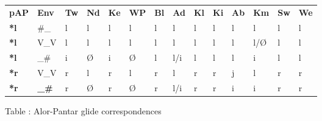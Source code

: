 \begin{center}
\tablehead{}
\begin{supertabular}{m{0.38585985in}m{0.39485985in}m{0.30315986in}m{0.28445986in}m{0.27545986in}m{0.34005985in}m{0.22885984in}m{0.28445986in}m{0.24695987in}m{0.24765986in}m{0.28445986in}m{0.34005985in}m{0.28445986in}m{0.31505984in}}
\textbf{pAP} &
\textbf{Env} &
\textbf{Tw} &
\textbf{Nd} &
\textbf{Ke} &
\textbf{WP} &
\textbf{Bl} &
\textbf{Ad} &
\textbf{Kl} &
\textbf{Ki} &
\textbf{Ab} &
\textbf{Km} &
\textbf{Sw} &
\textbf{We}\\
\textbf{*l} &
\#\_ &
l &
l &
l &
l &
l &
l &
l &
l &
l &
l &
l &
l\\
\textbf{*l} &
V\_V &
l &
l &
l &
l &
l &
l &
l &
l &
l &
l/{\O} &
l &
l\\
\textbf{*l} &
\_\# &
i &
{\O} &
i &
{\O} &
l &
l/i &
l &
l &
l &
i &
l &
l\\
\textbf{*r } &
V\_V &
r &
l &
r &
l &
r &
l &
r &
r &
j &
l &
r &
r\\
\textbf{*r} &
\textbf{\_\#} &
r &
{\O} &
r &
{\O} &
r &
 l/i &
r &
r &
i &
i &
r &
r\\
\end{supertabular}
\end{center}
{\centering
Table : Alor-Pantar glide correspondences
\par}

